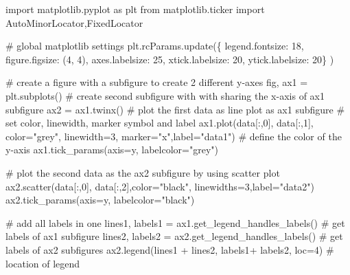 \documentclass[
  letterpaper,
]{article}
\newenvironment{Shaded}{\begin{snugshade}}{\end{snugshade}}
\newcommand{\CommentTok}[1]{\textcolor[rgb]{0.37,0.37,0.37}{#1}}
\newcommand{\DecValTok}[1]{\textcolor[rgb]{0.68,0.00,0.00}{#1}}
\newcommand{\ImportTok}[1]{\textcolor[rgb]{0.00,0.46,0.62}{#1}}
\newcommand{\NormalTok}[1]{\textcolor[rgb]{0.00,0.23,0.31}{#1}}
\newcommand{\OperatorTok}[1]{\textcolor[rgb]{0.37,0.37,0.37}{#1}}
\newcommand{\StringTok}[1]{\textcolor[rgb]{0.13,0.47,0.30}{#1}}
\begin{document}
\begin{Shaded}
\begin{Highlighting}[]
\ImportTok{import}\NormalTok{ matplotlib.pyplot }\ImportTok{as}\NormalTok{ plt}
\ImportTok{from}\NormalTok{ matplotlib.ticker }\ImportTok{import}\NormalTok{ AutoMinorLocator,FixedLocator}


\CommentTok{\# global matplotlib settings}
\NormalTok{plt.rcParams.update(\{}
    \StringTok{\textquotesingle{}legend.fontsize\textquotesingle{}}\NormalTok{: }\DecValTok{18}\NormalTok{,}
    \StringTok{\textquotesingle{}figure.figsize\textquotesingle{}}\NormalTok{: (}\DecValTok{4}\NormalTok{, }\DecValTok{4}\NormalTok{),}
    \StringTok{\textquotesingle{}axes.labelsize\textquotesingle{}}\NormalTok{: }\DecValTok{25}\NormalTok{,}
    \StringTok{\textquotesingle{}xtick.labelsize\textquotesingle{}}\NormalTok{: }\DecValTok{20}\NormalTok{,}
    \StringTok{\textquotesingle{}ytick.labelsize\textquotesingle{}}\NormalTok{: }\DecValTok{20}\NormalTok{\}}
\NormalTok{)}

\CommentTok{\# create a figure with a subfigure to create 2 different y{-}axes}
\NormalTok{fig, ax1 }\OperatorTok{=}\NormalTok{ plt.subplots()}
\CommentTok{\# create second subfigure with with sharing the x{-}axis of ax1 subfigure}
\NormalTok{ax2 }\OperatorTok{=}\NormalTok{ ax1.twinx() }
\CommentTok{\# plot the first data as line plot as ax1 subfigure}
\CommentTok{\# set color, linewidth, marker symbol and label}
\NormalTok{ax1.plot(data[:,}\DecValTok{0}\NormalTok{], data[:,}\DecValTok{1}\NormalTok{], color}\OperatorTok{=}\StringTok{"grey"}\NormalTok{, linewidth}\OperatorTok{=}\DecValTok{3}\NormalTok{, marker}\OperatorTok{=}\StringTok{"x"}\NormalTok{,label}\OperatorTok{=}\StringTok{"data1"}\NormalTok{)}
\CommentTok{\# define the color of the y{-}axis}
\NormalTok{ax1.tick\_params(axis}\OperatorTok{=}\StringTok{\textquotesingle{}y\textquotesingle{}}\NormalTok{, labelcolor}\OperatorTok{=}\StringTok{"grey"}\NormalTok{)}

\CommentTok{\# plot the second data as the ax2 subfigure by using scatter plot}
\NormalTok{ax2.scatter(data[:,}\DecValTok{0}\NormalTok{], data[:,}\DecValTok{2}\NormalTok{],color}\OperatorTok{=}\StringTok{"black"}\NormalTok{, linewidths}\OperatorTok{=}\DecValTok{3}\NormalTok{,label}\OperatorTok{=}\StringTok{"data2"}\NormalTok{)}
\NormalTok{ax2.tick\_params(axis}\OperatorTok{=}\StringTok{\textquotesingle{}y\textquotesingle{}}\NormalTok{, labelcolor}\OperatorTok{=}\StringTok{"black"}\NormalTok{)}

\CommentTok{\# add all labels in one }
\NormalTok{lines1, labels1 }\OperatorTok{=}\NormalTok{ ax1.get\_legend\_handles\_labels() }\CommentTok{\# get labels of ax1 subfigure}
\NormalTok{lines2, labels2 }\OperatorTok{=}\NormalTok{ ax2.get\_legend\_handles\_labels() }\CommentTok{\# get labels of ax2 subfigures}
\NormalTok{ax2.legend(lines1 }\OperatorTok{+}\NormalTok{ lines2, labels1}\OperatorTok{+}\NormalTok{ labels2, loc}\OperatorTok{=}\DecValTok{4}\NormalTok{) }\CommentTok{\# location of legend}


\end{Highlighting}
\end{Shaded}
\end{document}
